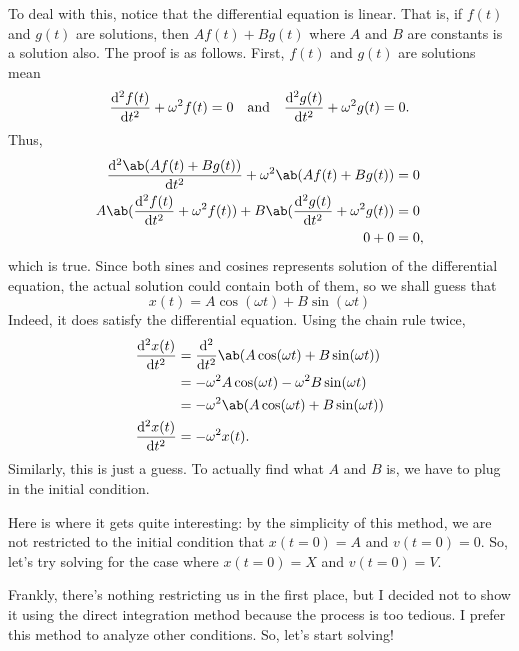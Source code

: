 To deal with this, notice that the differential equation is linear. That is, if \(f(t)\) and \(g(t)\) are solutions, then \(Af(t) + Bg(t)\) where \(A\) and \(B\) are constants is a solution also. The proof is as follows. First, \(f(t)\) and \(g(t)\) are solutions mean
\begin{equation}
  \odv[ord = 2]{f(t)}{t} + \omega^2f(t) = 0 \mathand \odv[ord = 2]{g(t)}{t} + \omega^2g(t) = 0.
\end{equation}
Thus,
\begin{align}
  \odv[ord = 2]{\ab(Af(t) + Bg(t))}{t} + \omega^2\ab(Af(t) + Bg(t))                         & = 0  \\
  A\ab(\odv[ord = 2]{f(t)}{t} + \omega^2f(t)) + B\ab(\odv[ord = 2]{g(t)}{t} + \omega^2g(t)) & = 0  \\
  0 + 0                                                                                     & = 0,
\end{align}
which is true. Since both sines and cosines represents solution of the differential equation, the actual solution could contain both of them, so we shall guess that
\begin{equation}
  x(t) = A\cos(\omega t) + B\sin(\omega t)
\end{equation}
Indeed, it does satisfy the differential equation. Using the chain rule twice,
\begin{align}
  \odv[ord = 2]{x(t)}{t}
                         & = \odv*[ord = 2]{\ab(A\cos(\omega t) + B\sin(\omega t))}{t}                                        \\
                         & = -\omega^2A\cos(\omega t) - \omega^2B\sin(\omega t)                                               \\
                         & = -\omega^2\ab(A\cos(\omega t) + B\sin(\omega t)) \label{eq:harmonic-oscillator-ansatz-derivative} \\
  \odv[ord = 2]{x(t)}{t} & = -\omega^2x(t).
\end{align}
Similarly, this is just a guess. To actually find what \(A\) and \(B\) is, we have to plug in the initial condition.

Here is where it gets quite interesting: by the simplicity of this method, we are not restricted to the initial condition that \(x(t = 0) = A\) and \(v(t = 0) = 0\). So, let's try solving for the case where \(x(t = 0) = X\) and \(v(t = 0) = V\).

Frankly, there's nothing restricting us in the first place, but I decided not to show it using the direct integration method because the process is too tedious. I prefer this method to analyze other conditions. So, let's start solving!

